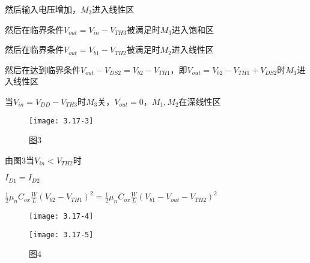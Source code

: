 然后输入电压增加，$M_3$进入线性区

然后在临界条件$V_{out}=V_{in}-V_{TH3}$被满足时$M_3$进入饱和区

然后在临界条件$V_{out}=V_{b1}-V_{TH2}$被满足时$M_2$进入线性区

然后在达到临界条件$V_{out}-V_{DS2}=V_{b2}-V_{TH1}$，即$V_{out}=V_{b2}-V_{TH1}+V_{DS2}$时$M_1$进入线性区

当$V_{in}=V_{DD}-V_{TH3}$时$M_3$关，$V_{out}=0$，$M_1,M_2$在深线性区


		\begin{figure}[H] %
	\begin{minipage}{\linewidth}
		\texttt{[image: 3.17-3]}
	\end{minipage}
	\caption*{图3} %
\end{figure}

\scalebox{3}{（d）}



由图3当$V_{in}<V_{TH2}$时

$I_{D1}=I_{D2}$

$\frac{1}{2}\mu_nC_{ox}\frac{W}{L}(V_{b2}-V_{TH1})^2=\frac{1}{2}\mu_nC_{ox}\frac{W}{L}(V_{b1}-V_{out}-V_{TH2})^2$

\begin{figure}[H] %
	\begin{minipage}{\linewidth}
		\texttt{[image: 3.17-4]}
	\end{minipage}
\end{figure}














		\begin{figure}[H] %
	\begin{minipage}{\linewidth}
		\texttt{[image: 3.17-5]}
	\end{minipage}
	\caption*{图4} %
\end{figure}


\color{black}{}
